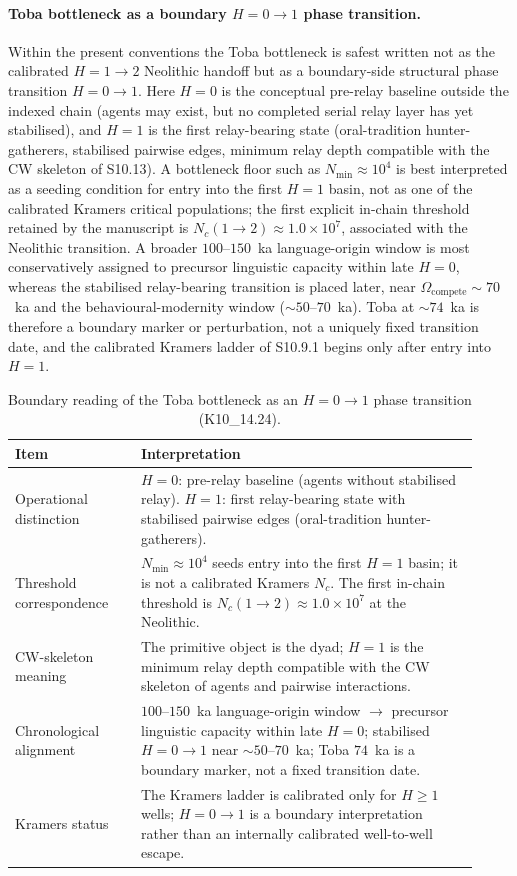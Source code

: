 \documentclass[11pt]{article}
\begin{document}
\paragraph{Toba bottleneck as a boundary $H{=}0\to 1$ phase transition.}
Within the present conventions the Toba bottleneck is safest written not as the calibrated $H{=}1\to 2$ Neolithic handoff but as a boundary-side structural phase transition $H{=}0\to 1$.  Here $H{=}0$ is the conceptual pre-relay baseline outside the indexed chain (agents may exist, but no completed serial relay layer has yet stabilised), and $H{=}1$ is the first relay-bearing state (oral-tradition hunter-gatherers, stabilised pairwise edges, minimum relay depth compatible with the CW skeleton of S10.13).  A bottleneck floor such as $N_{\min}\approx 10^{4}$ is best interpreted as a seeding condition for entry into the first $H{=}1$ basin, not as one of the calibrated Kramers critical populations; the first explicit in-chain threshold retained by the manuscript is $N_c(1\to 2)\approx 1.0\times 10^{7}$, associated with the Neolithic transition.  A broader $100$--$150$~ka language-origin window is most conservatively assigned to precursor linguistic capacity within late $H{=}0$, whereas the stabilised relay-bearing transition is placed later, near $\Omega_{\mathrm{compete}}\sim 70$~ka and the behavioural-modernity window ($\sim 50$--$70$~ka).  Toba at $\sim 74$~ka is therefore a boundary marker or perturbation, not a uniquely fixed transition date, and the calibrated Kramers ladder of S10.9.1 begins only after entry into $H{=}1$.
\begin{table}[H]
\centering
\caption{Boundary reading of the Toba bottleneck as an $H{=}0\to 1$ phase transition (K10\_14.24).}
\label{tab:S7b_toba_h0_h1}
\small
\begin{tabular}{|p{0.25\linewidth}|p{0.67\linewidth}|}
\hline
Item & Interpretation \\
\hline
Operational distinction & $H{=}0$: pre-relay baseline (agents without stabilised relay).  $H{=}1$: first relay-bearing state with stabilised pairwise edges (oral-tradition hunter-gatherers). \\
\hline
Threshold correspondence & $N_{\min}\approx 10^{4}$ seeds entry into the first $H{=}1$ basin; it is not a calibrated Kramers $N_c$.  The first in-chain threshold is $N_c(1\to 2)\approx 1.0\times 10^{7}$ at the Neolithic. \\
\hline
CW-skeleton meaning & The primitive object is the dyad; $H{=}1$ is the minimum relay depth compatible with the CW skeleton of agents and pairwise interactions. \\
\hline
Chronological alignment & $100$--$150$~ka language-origin window $\to$ precursor linguistic capacity within late $H{=}0$; stabilised $H{=}0\to 1$ near $\sim 50$--$70$~ka; Toba $74$~ka is a boundary marker, not a fixed transition date. \\
\hline
Kramers status & The Kramers ladder is calibrated only for $H{\ge}1$ wells; $H{=}0\to 1$ is a boundary interpretation rather than an internally calibrated well-to-well escape. \\
\hline
\end{tabular}
\end{table}
\end{document}
